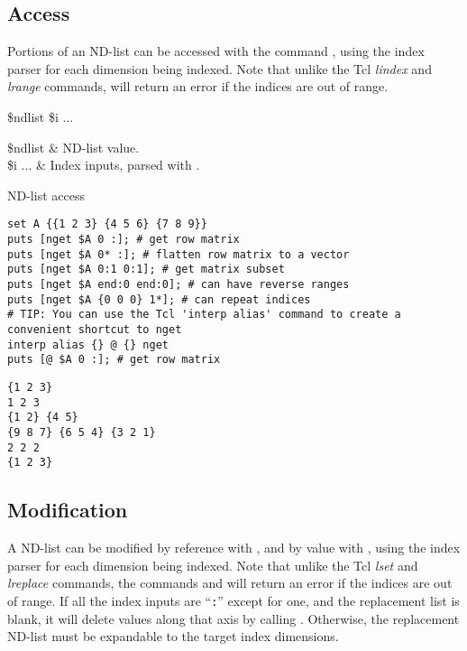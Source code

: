 \subsection{Access}
Portions of an ND-list can be accessed with the command , using the index parser  for each dimension being indexed.
Note that unlike the Tcl \textit{lindex} and \textit{lrange} commands,  will return an error if the indices are out of range.
\begin{syntax}
 \$ndlist \$i ...
\end{syntax}
\begin{args}
\$ndlist & ND-list value. \\
\$i ... & Index inputs, parsed with . 
\end{args}
\begin{example}{ND-list access}
\begin{lstlisting}
set A {{1 2 3} {4 5 6} {7 8 9}}
puts [nget $A 0 :]; # get row matrix
puts [nget $A 0* :]; # flatten row matrix to a vector
puts [nget $A 0:1 0:1]; # get matrix subset
puts [nget $A end:0 end:0]; # can have reverse ranges
puts [nget $A {0 0 0} 1*]; # can repeat indices
# TIP: You can use the Tcl 'interp alias' command to create a convenient shortcut to nget
interp alias {} @ {} nget
puts [@ $A 0 :]; # get row matrix
\end{lstlisting}
\tcblower
\begin{lstlisting}
{1 2 3}
1 2 3
{1 2} {4 5}
{9 8 7} {6 5 4} {3 2 1}
2 2 2
{1 2 3}
\end{lstlisting}
\end{example}

\clearpage
\subsection{Modification}
A ND-list can be modified by reference with , and by value with , using the index parser  for each dimension being indexed.
Note that unlike the Tcl \textit{lset} and \textit{lreplace} commands, the commands  and  will return an error if the indices are out of range.
If all the index inputs are ``\texttt{:}'' except for one, and the replacement list is blank, it will delete values along that axis by calling .
Otherwise, the replacement ND-list must be expandable to the target index dimensions. 

